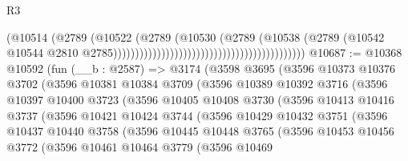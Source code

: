 \begin{lexlean}{R3}
\begin{coremodule}
                                                                          (@10514
                                                                            (@2789
                                                                              (@10522
                                                                                (@2789
                                                                                  (@10530
                                                                                    (@2789
                                                                                      (@10538
                                                                                        (@2789
                                                                                          (@10542
                                                                                            @10544
                                                                                            @2810
                                                                                            @2785))))))))))))))))))))))))))))))))))))))))))))
@10687 := @10368
    @10592
    (fun (__b : @2587) =>
    @3174
      (@3598
        @3695
        (@3596
          @10373
          @10376
          @3702
          (@3596
            @10381
            @10384
            @3709
            (@3596
              @10389
              @10392
              @3716
              (@3596
                @10397
                @10400
                @3723
                (@3596
                  @10405
                  @10408
                  @3730
                  (@3596
                    @10413
                    @10416
                    @3737
                    (@3596
                      @10421
                      @10424
                      @3744
                      (@3596
                        @10429
                        @10432
                        @3751
                        (@3596
                          @10437
                          @10440
                          @3758
                          (@3596
                            @10445
                            @10448
                            @3765
                            (@3596
                              @10453
                              @10456
                              @3772
                              (@3596
                                @10461
                                @10464
                                @3779
                                (@3596
                                  @10469

\end{coremodule}
\end{lexlean}
